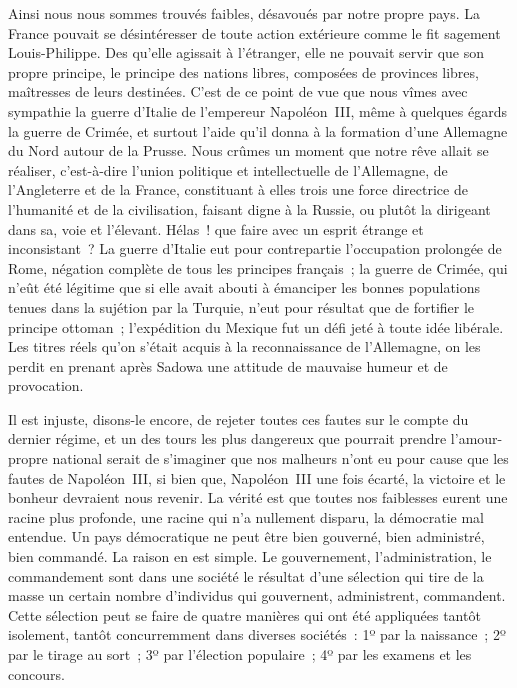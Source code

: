 \documentclass[french,twoside]{book} %
\begin{document}
Ainsi nous nous sommes trouvés faibles, désavoués par notre propre pays. La France pouvait se désintéresser de toute action extérieure comme le fit sagement Louis-Philippe. Des qu’elle agissait à l’étranger, elle ne pouvait servir que son propre principe, le principe des nations libres, composées de provinces libres, maîtresses de leurs destinées. C’est de ce point de vue que nous vîmes avec sympathie la guerre d’Italie de l’empereur Napoléon III, même à quelques égards la guerre de Crimée, et surtout l’aide qu’il donna à la formation d’une Allemagne du Nord autour de la Prusse. Nous crûmes un moment que notre rêve allait se réaliser, c’est-à-dire l’union politique et intellectuelle de l’Allemagne, de l’Angleterre et de la France, constituant à elles trois une force directrice de l’humanité et de la civilisation, faisant digne à la Russie, ou plutôt la dirigeant dans sa, voie et l’élevant. Hélas ! que faire avec un esprit étrange et inconsistant ? La guerre d’Italie eut pour contrepartie l’occupation prolongée de Rome, négation complète de tous les principes français ; la guerre de Crimée, qui n’eût été légitime que si elle avait abouti à émanciper les bonnes populations tenues dans la sujétion par la Turquie, n’eut pour résultat que de fortifier le principe ottoman ; l’expédition du Mexique fut un défi jeté à toute idée libérale. Les titres réels qu’on s’était acquis à la reconnaissance de l’Allemagne, on les perdit en prenant après Sadowa une attitude de mauvaise humeur et de provocation.\par
Il est injuste, disons-le encore, de rejeter toutes ces fautes sur le compte du dernier régime, et un des tours les plus dangereux que pourrait prendre l’amour-propre national serait de s’imaginer que nos malheurs n’ont eu pour cause que les fautes de Napoléon III, si bien que, Napoléon III une fois écarté, la victoire et le bonheur devraient nous revenir. La vérité est que toutes nos faiblesses eurent une racine plus profonde, une racine qui n’a nullement disparu, la démocratie mal entendue. Un pays démocratique ne peut être bien gouverné, bien administré, bien commandé. La raison en est simple. Le gouvernement, l’administration, le commandement sont dans une société le résultat d’une sélection qui tire de la masse un certain nombre d’individus qui gouvernent, administrent, commandent. Cette sélection peut se faire de quatre manières qui ont été appliquées tantôt isolement, tantôt concurremment dans diverses sociétés : 1º par la naissance ; 2º par le tirage au sort ; 3º par l’élection populaire ; 4º par les examens et les concours.\par
\end{document}

